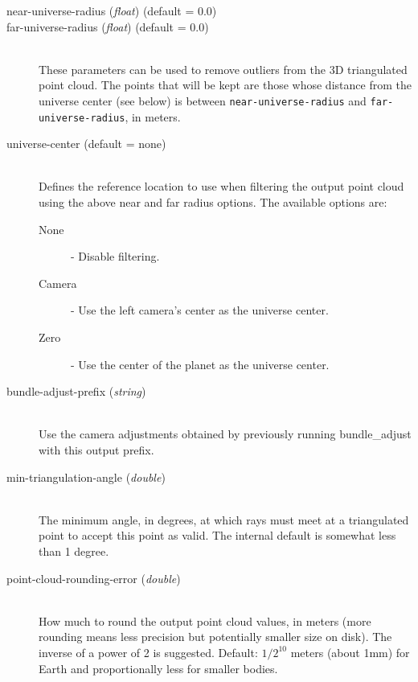 \begin{description}
\item[near-universe-radius \textnormal{\small{(\emph{float})}} (default = 0.0)]
\item[far-universe-radius \textnormal{\small{(\emph{float})}} (default = 0.0)] \hfill \\

These parameters can be used to remove outliers from the 3D triangulated
point cloud. The points that will be kept are those whose distance from
the universe center (see below) is between \texttt{near-universe-radius}
and \texttt{far-universe-radius}, in meters.

\item[universe-center \textnormal (default = none)] \hfill \\
Defines the reference location to use when filtering the output point cloud
using the above near and far radius options. The available options
are:

  \begin{description}
    \item[None] - Disable filtering.
    \item[Camera] - Use the left camera's center as the universe center.
    \item[Zero]   - Use the center of the planet as the universe center.
  \end{description}

\item[bundle-adjust-prefix \textnormal{\small{(\emph{string})}}] \hfill \\ Use the camera adjustments obtained by previously running bundle\_adjust with this output prefix.

\item[min-triangulation-angle \textnormal{\small{(\emph{double})}}] \hfill \\
The minimum angle, in degrees, at which rays must meet at a triangulated
point to accept this point as valid. The internal default is somewhat
less than 1 degree.

\item[point-cloud-rounding-error \textnormal{\small{(\emph{double})}}] \hfill \\

How much to round the output point cloud values, in meters (more
rounding means less precision but potentially smaller size on disk). The
inverse of a power of 2 is suggested. Default: $1/2^{10}$ meters (about 1mm) for Earth and
proportionally less for smaller bodies.


\end{description}
